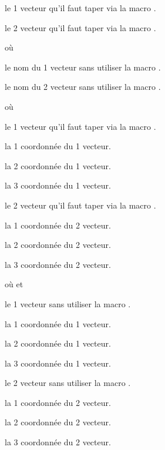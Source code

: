 \documentclass[12pt,a4paper]{article}
\begin{document}

 le 1\ier{} vecteur qu'il faut taper via la macro .

 le 2\ieme{} vecteur qu'il faut taper via la macro .


\separation


 où \quad {}

 le nom du 1\ier{} vecteur sans utiliser la macro .

 le nom du 2\ieme{} vecteur sans utiliser la macro .


\separation


  où \quad {}

 le 1\ier{} vecteur qu'il faut taper via la macro .

 la 1\iere{} coordonnée du 1\ier{} vecteur.

 la 2\ieme{} coordonnée du 1\ier{} vecteur.

 la 3\ieme{} coordonnée du 1\ier{} vecteur.

 le 2\ieme{} vecteur qu'il faut taper via la macro .

 la 1\iere{} coordonnée du 2\ieme{} vecteur.

 la 2\ieme{} coordonnée du 2\ieme{} vecteur.

 la 3\ieme{} coordonnée du 2\ieme{} vecteur.


\separation


 où \quad {}
                                et 

 le 1\ier{} vecteur sans utiliser la macro .

 la 1\iere{} coordonnée du 1\ier{} vecteur.

 la 2\ieme{} coordonnée du 1\ier{} vecteur.

 la 3\ieme{} coordonnée du 1\ier{} vecteur.

 le 2\ieme{} vecteur sans utiliser la macro .

 la 1\iere{} coordonnée du 2\ieme{} vecteur.

 la 2\ieme{} coordonnée du 2\ieme{} vecteur.

 la 3\ieme{} coordonnée du 2\ieme{} vecteur.
\end{document}
